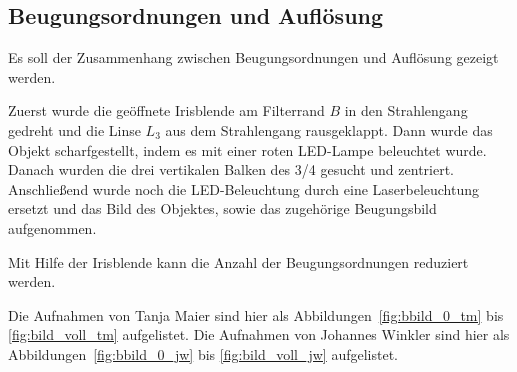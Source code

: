 \documentclass{article}
\begin{document}
\subsection{Beugungsordnungen und Auflösung}

Es soll der Zusammenhang zwischen Beugungsordnungen und Auflösung gezeigt werden. 

Zuerst wurde die geöffnete Irisblende am Filterrand $B$ in den Strahlengang gedreht und die Linse $L_3$ aus dem Strahlengang rausgeklappt. Dann wurde das Objekt scharfgestellt, indem es mit einer roten LED-Lampe beleuchtet wurde. Danach wurden die drei vertikalen Balken des 3/4 gesucht und zentriert. Anschließend wurde noch die LED-Beleuchtung durch eine Laserbeleuchtung ersetzt und das Bild des Objektes, sowie das zugehörige Beugungsbild aufgenommen.

Mit Hilfe der Irisblende kann die Anzahl der Beugungsordnungen reduziert werden.

Die Aufnahmen von Tanja Maier sind hier als Abbildungen~\ref{fig:bbild_0_tm} bis \ref{fig:bild_voll_tm} aufgelistet.
Die Aufnahmen von Johannes Winkler sind hier als Abbildungen~\ref{fig:bbild_0_jw} bis \ref{fig:bild_voll_jw} aufgelistet.
\end{document}
